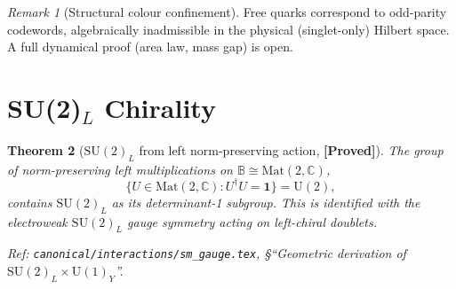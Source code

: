 \documentclass[12pt,a4paper]{article}
\newtheorem{theorem}{Theorem}[section]
\theoremstyle{definition}
\theoremstyle{remark}
\newtheorem{remark}[theorem]{Remark}
\newcommand{\PROVED}{\textbf{[Proved]}}
\newcommand{\SU}[1]{\mathrm{SU}(#1)}
\newcommand{\UU}[1]{\mathrm{U}(#1)}
\begin{document}
\begin{remark}[Structural colour confinement]
Free quarks correspond to odd-parity codewords, algebraically inadmissible
in the physical (singlet-only) Hilbert space.
A full dynamical proof (area law, mass gap) is open.
\end{remark}

\section{SU(2)$_L$ Chirality}
\label{sec:su2}

\begin{theorem}[$\SU{2}_L$ from left norm-preserving action, \PROVED]
\label{thm:su2}
The group of norm-preserving left multiplications on
$\mathbb{B}\cong\mathrm{Mat}(2,\mathbb{C})$,
\[
  \{U\in\mathrm{Mat}(2,\mathbb{C}) : U^\dagger U = \mathbf{1}\} = \UU{2},
\]
contains $\SU{2}_L$ as its determinant-1 subgroup.
This is identified with the electroweak $\SU{2}_L$ gauge symmetry acting
on left-chiral doublets.

Ref: \texttt{canonical/interactions/sm\_gauge.tex},
\S ``Geometric derivation of $\SU{2}_L\times\UU{1}_Y$''.
\end{theorem}
\end{document}

